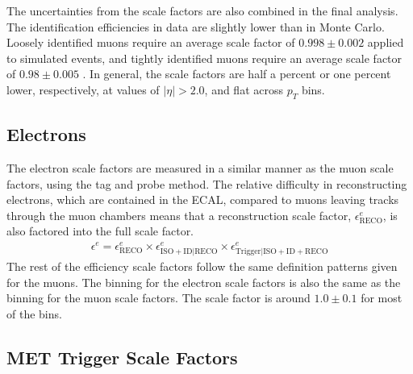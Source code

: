 The uncertainties from the scale factors are also combined in the final analysis.
The identification efficiencies in data are slightly lower than in Monte Carlo.
Loosely identified muons require an average scale factor of $0.998\pm0.002$ applied to simulated events,
and tightly identified muons require an average scale factor of $0.98\pm0.005$
\cite{CMS-DP-2019-022}.
In general, the scale factors are half a percent or one percent lower, respectively,
at values of $|\eta| > 2.0$, and flat across $p_T$ bins.

\subsection{Electrons}

The electron scale factors are measured in a similar manner as the muon scale factors,
using the tag and probe method.
The relative difficulty in reconstructing electrons, which are contained in the ECAL,
compared to muons leaving tracks through the muon chambers
means that a reconstruction scale factor, $\epsilon^e_\mathrm{RECO}$, is also factored into the full scale factor.
\begin{gather}
  \epsilon^e = \epsilon^e_\mathrm{RECO} \times \epsilon^e_\mathrm{ISO + ID|RECO} \times \epsilon^e_\mathrm{Trigger|ISO + ID + RECO}
\end{gather}
The rest of the efficiency scale factors follow the same definition patterns given for the muons.
The binning for the electron scale factors is also the same as the binning for the muon scale factors.
The scale factor is around $1.0 \pm 0.1$ for most of the
bins. 

\subsection{MET Trigger Scale Factors}

